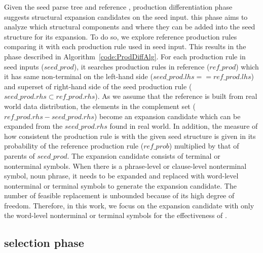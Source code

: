 Given the seed parse tree and reference \pcfg, production
differentiation phase suggests structural expansion candidates on the
seed input. this phase aims to analyze which structural components and
where they can be added into the seed structure for its expansion. To
do so, we explore reference production rules comparing it with each
production rule used in seed input. This results in the phase
described in Algorithm~\ref{code:ProdDiffAlg}. For each production
rule in seed inputs ($seed\_prod$), it searches production rules in
reference ($ref\_prod$) which it has same non-terminal on the
left-hand side ($seed\_prod.lhs==ref\_prod.lhs$) and superset of
right-hand side of the seed production rule ($seed\_prod.rhs \subset
ref\_prod.rhs$).  As we assume that the reference \cfg is built from
real world data distribution, the elements in the complement set
($ref\_prod.rhs - seed\_prod.rhs$) become an expansion candidate which
can be expanded from the $seed\_prod.rhs$ found in real world. In
addition, the measure of how consistent the production rule is with
the given seed structure is given in its probability of the reference
production rule ($ref\_prob$) multiplied by that of parents of
$seed\_prod$. The expansion candidate consists of terminal or
nonterminal symbols. When there is a phrase-level or clause-level
nonterminal symbol, \eg noun phrase, it needs to be expanded and
replaced with word-level nonterminal or terminal symbols to generate
the expansion candidate. The number of feasible replacement is
unbounded because of its high degree of freedom. Therefore, in this
work, we focus on the expansion candidate with only the word-level
nonterminal or terminal symbols for the effectiveness of \Model.

\subsection{\Sent selection phase}

